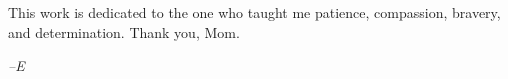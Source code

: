 
\begin{dedication}
This work is dedicated to the one who taught me patience, compassion, bravery, and determination. Thank you, Mom.
  
\begin{center}
\emph{--E}
\end{center}
\end{dedication}
